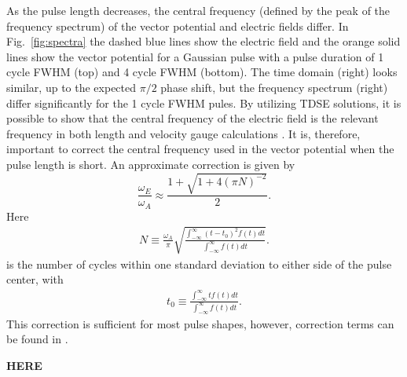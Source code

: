 As the pulse length decreases, the central frequency (defined by the peak of the frequency spectrum) of the vector potential and electric fields differ. In Fig.~\ref{fig:spectra} the dashed blue lines show the electric field and the orange solid lines show the vector potential for a Gaussian pulse with a pulse duration of 1 cycle FWHM (top) and 4 cycle FWHM (bottom). The time domain (right) looks similar, up to the expected $\pi/2$ phase shift, but the frequency spectrum (right) differ significantly for the 1 cycle FWHM pules. By utilizing TDSE solutions, it is possible to show that the central frequency of the electric field is the relevant frequency in both length and velocity gauge calculations \cite{venzke2018_Central}. 
It is, therefore, important to correct the central frequency used in the vector potential when the pulse length is short. An approximate correction is given by
\begin{equation}
\label{eq:fshift}
\frac{\omega_E}{\omega_A} 
\approx
\frac{1+\sqrt{1+4(\pi N)^{-2}}}{2}.
\end{equation}
%
Here
%
\begin{equation}
\begin{split}
\label{eq:nbar}
 N \equiv \frac{\omega_A}{\pi} \sqrt{\frac{\int_{-\infty}^{\infty} (t-t_0)^2 f(t) dt}{\int_{-\infty}^{\infty} f(t) dt}}.
\end{split}
\end{equation}
%
is the number of cycles within one standard deviation to either side of the pulse center, with
%
\begin{equation}
\begin{split}
t_0 \equiv \frac{\int_{-\infty}^{\infty} t f(t) dt}{\int_{-\infty}^{\infty} f(t) dt}.
\end{split}
\end{equation}
This correction is sufficient for most pulse shapes, however, correction terms can be found in \cite{venzke2018_Central}.




\textbf{HERE}


